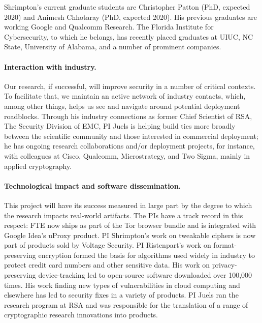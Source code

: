Shrimpton's current graduate students are Christopher Patton (PhD,
expected 2020) and Animesh Chhotaray (PhD, expected 2020).  His
previous graduates are working Google and Qualcomm Research.  The Florida
Institute for Cybersecurity, to which he belongs, has recently placed
graduates at UIUC, NC State, University of Alabama, and a number of
prominent companies.




\paragraph{Interaction with industry.} Our research, if successful, will improve
security in a number of critical contexts. To facilitate that, we maintain an
active network of industry contacts, which, among other things, helps us see and
navigate around potential deployment roadblocks.  Through his industry
connections as former Chief Scientist of RSA, The Security Division of EMC, PI
Juels is helping build ties more broadly between the scientific community and
those interested in commercial deployment; he has ongoing research
collaborations and/or deployment projects, for instance, with colleagues at
Cisco, Qualcomm, Microstrategy, and Two Sigma, mainly in applied cryptography.

\paragraph{Technological impact and software dissemination.}
This project will have its success measured in large part by
the degree to which the research impacts real-world artifacts.  
The PIs have a track record in this respect: FTE now ships as
part of the Tor browser bundle and is integrated with Google Idea's
uProxy product. PI Shrimpton's work on tweakable ciphers is now part of
products sold by Voltage Security. PI Ristenpart's work on format-preserving
encryption formed the basis for algorithms used widely in industry to protect
credit card numbers and other sensitive data. His work on privacy-preserving
device-tracking led to open-source software downloaded over 100,000 times. 
His work finding new types of vulnerabilities in cloud computing and elsewhere
has led to security fixes in a variety of products. PI Juels ran the research program at RSA and was responsible for the translation of a range of cryptographic research innovations into products.


